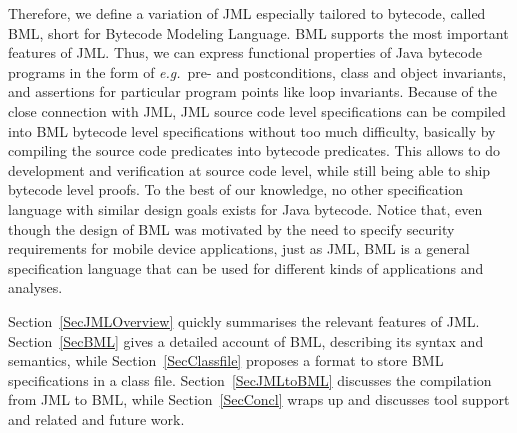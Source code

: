 Therefore, we define a variation of JML especially tailored to
bytecode, called BML, short for Bytecode Modeling Language.
BML supports the most important features of JML. Thus, we can express
functional properties of Java bytecode programs in the form of
\emph{e.g.}\ pre- and postconditions, class and object invariants, and
assertions for particular program points like loop invariants. Because
of the close connection with JML, JML source code level specifications
can be compiled into BML bytecode level specifications without too
much difficulty, basically by compiling the source code predicates
into bytecode predicates.  This allows to do development and
verification at source code level, while still being able to ship
bytecode level proofs.  To the best of our knowledge, no other
specification language with similar design goals exists for Java
bytecode. Notice that, even though the design of BML was motivated by
the need to specify security requirements for mobile device
applications, just as JML, BML is a general specification language
that can be used for different kinds of applications and analyses.

Section~\ref{SecJMLOverview} quickly summarises the relevant features
of JML. Section~\ref{SecBML} gives a detailed account of BML,
describing its syntax and semantics, while Section~\ref{SecClassfile}
proposes a format to store BML specifications in a class
file. Section~\ref{SecJMLtoBML} discusses the compilation from JML to
BML, while Section~\ref{SecConcl} wraps up and discusses tool support
and related and future work.


